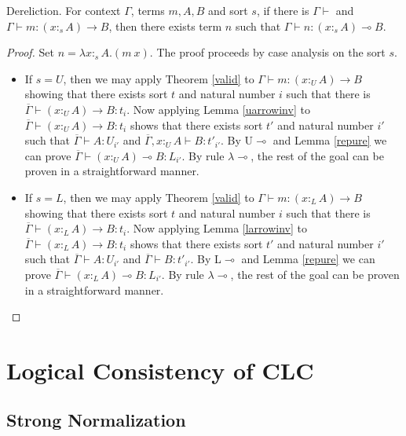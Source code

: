 \documentclass[sigplan,screen,review,anonymous]{acmart}
\newcommand{\rname}[1]{\textsc{\footnotesize #1}}
\newcommand{\utype}{:_{\scriptscriptstyle U}}
\newcommand{\ltype}{:_{\scriptscriptstyle L}}
\newcommand{\stype}[1]{:_#1}
\begin{document}
\begin{theorem}
  Dereliction. For context $\Gamma$, terms $m, A, B$ and sort $s$, if there is $\Gamma \vdash$ and $\Gamma \vdash m : (x \stype{s} A) \rightarrow B$, then there exists term $n$ such that $\Gamma \vdash n : (x \stype{s} A) \multimap B$.
\end{theorem}
\begin{proof}
  Set $n = \lambda x \stype{s} A . (m\ x)$. The proof proceeds by case analysis on the sort $s$.
  \begin{itemize}
    \item If $s = U$, then we may apply Theorem \ref{valid} to $\Gamma \vdash m : (x \utype A) \rightarrow B$ showing that there exists sort $t$ and natural number $i$ such that there is $\overline{\Gamma} \vdash (x \utype A) \rightarrow B : t_i$. Now applying Lemma \ref{uarrowinv} to $\overline{\Gamma} \vdash (x \utype A)\rightarrow B : t_i$ shows that there exists sort $t'$ and natural number $i'$ such that $\overline{\Gamma} \vdash A : U_{i'}$ and $\overline{\Gamma}, x \utype A \vdash B : t'_{i'}$. By \rname{U$\multimap$} and Lemma \ref{repure} we can prove $\overline{\Gamma} \vdash (x \utype A) \multimap B : L_{i'}$. By rule \rname{$\lambda$$\multimap$}, the rest of the goal can be proven in a straightforward manner.
    \item If $s = L$, then we may apply Theorem \ref{valid} to $\Gamma \vdash m : (x \ltype A) \rightarrow B$ showing that there exists sort $t$ and natural number $i$ such that there is $\overline{\Gamma} \vdash (x \ltype A) \rightarrow B : t_i$. Now applying Lemma \ref{larrowinv} to $\overline{\Gamma} \vdash (x \ltype A)\rightarrow B : t_i$ shows that there exists sort $t'$ and natural number $i'$ such that $\overline{\Gamma} \vdash A : U_{i'}$ and $\overline{\Gamma} \vdash B : t'_{i'}$. By \rname{L$\multimap$} and Lemma \ref{repure} we can prove $\overline{\Gamma} \vdash (x \ltype A) \multimap B : L_{i'}$. By rule \rname{$\lambda$$\multimap$}, the rest of the goal can be proven in a straightforward manner.
  \end{itemize}
\end{proof}

\section{Logical Consistency of CLC}

\subsection{Strong Normalization}
\end{document}
